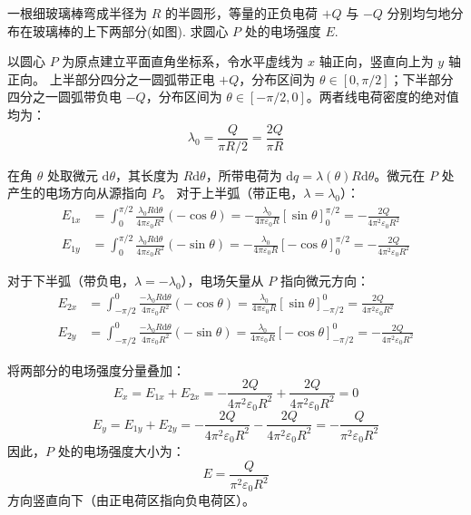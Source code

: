 \begin{exercise}\label{ex:15.6}
一根细玻璃棒弯成半径为 $R$ 的半圆形，等量的正负电荷 $+Q$ 与 $-Q$ 分别均匀地分布在玻璃棒的上下两部分(如图). 求圆心 $P$ 处的电场强度 $E$.
\begin{center}
\end{center}
\end{exercise}
\begin{solution}
以圆心 $P$ 为原点建立平面直角坐标系，令水平虚线为 $x$ 轴正向，竖直向上为 $y$ 轴正向。
上半部分四分之一圆弧带正电 $+Q$，分布区间为 $\theta \in [0, \pi/2]$；下半部分四分之一圆弧带负电 $-Q$，分布区间为 $\theta \in [-\pi/2, 0]$。两者线电荷密度的绝对值均为：
$$ \lambda_0 = \frac{Q}{\pi R / 2} = \frac{2Q}{\pi R} $$

在角 $\theta$ 处取微元 $\mathrm{d}\theta$，其长度为 $R\mathrm{d}\theta$，所带电荷为 $\mathrm{d}q = \lambda(\theta) R \mathrm{d}\theta$。微元在 $P$ 处产生的电场方向从源指向 $P$。
对于上半弧（带正电，$\lambda = \lambda_0$）：
\begin{align*}
    E_{1x} &= \int_0^{\pi/2} \frac{\lambda_0 R \mathrm{d}\theta}{4\pi\varepsilon_0 R^2} (-\cos\theta) = -\frac{\lambda_0}{4\pi\varepsilon_0 R} [\sin\theta]_0^{\pi/2} = -\frac{2Q}{4\pi^2\varepsilon_0 R^2} \\
    E_{1y} &= \int_0^{\pi/2} \frac{\lambda_0 R \mathrm{d}\theta}{4\pi\varepsilon_0 R^2} (-\sin\theta) = -\frac{\lambda_0}{4\pi\varepsilon_0 R} [-\cos\theta]_0^{\pi/2} = -\frac{2Q}{4\pi^2\varepsilon_0 R^2}
\end{align*}

对于下半弧（带负电，$\lambda = -\lambda_0$），电场矢量从 $P$ 指向微元方向：
\begin{align*}
    E_{2x} &= \int_{-\pi/2}^0 \frac{-\lambda_0 R \mathrm{d}\theta}{4\pi\varepsilon_0 R^2} (-\cos\theta) = \frac{\lambda_0}{4\pi\varepsilon_0 R} [\sin\theta]_{-\pi/2}^0 = \frac{2Q}{4\pi^2\varepsilon_0 R^2} \\
    E_{2y} &= \int_{-\pi/2}^0 \frac{-\lambda_0 R \mathrm{d}\theta}{4\pi\varepsilon_0 R^2} (-\sin\theta) = \frac{\lambda_0}{4\pi\varepsilon_0 R} [-\cos\theta]_{-\pi/2}^0 = -\frac{2Q}{4\pi^2\varepsilon_0 R^2}
\end{align*}

将两部分的电场强度分量叠加：
$$ E_x = E_{1x} + E_{2x} = -\frac{2Q}{4\pi^2\varepsilon_0 R^2} + \frac{2Q}{4\pi^2\varepsilon_0 R^2} = 0 $$
$$ E_y = E_{1y} + E_{2y} = -\frac{2Q}{4\pi^2\varepsilon_0 R^2} - \frac{2Q}{4\pi^2\varepsilon_0 R^2} = -\frac{Q}{\pi^2\varepsilon_0 R^2} $$
因此，$P$ 处的电场强度大小为：
$$ E = \frac{Q}{\pi^2\varepsilon_0 R^2} $$
方向竖直向下（由正电荷区指向负电荷区）。
\end{solution}

